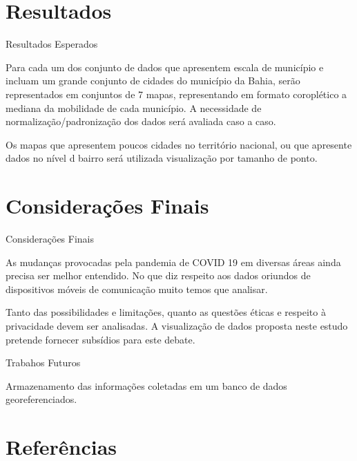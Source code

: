 \documentclass[10pt]{beamer}
\begin{document}
\section{Resultados}

\begin{frame}{Resultados Esperados}

  Para cada um dos conjunto de dados que apresentem escala de município e incluam um grande conjunto de cidades do município da Bahia, serão representados em conjuntos de 7 mapas, representando em formato coroplético a mediana da mobilidade de cada município. A necessidade de normalização/padronização dos dados será avaliada caso a caso. 

  Os mapas que apresentem poucos cidades no território nacional, ou que apresente dados no nível d bairro será utilizada visualização por tamanho de ponto.
  
\end{frame}

\section{Considerações Finais}

\begin{frame}{Considerações Finais}

  As mudanças provocadas pela pandemia de COVID 19 em diversas áreas ainda precisa ser melhor entendido. No que diz respeito aos dados oriundos de dispositivos móveis de comunicação muito temos que analisar.

  Tanto das possibilidades e limitações, quanto as questões éticas e respeito à privacidade devem ser analisadas. A visualização de dados proposta neste estudo pretende fornecer subsídios para este debate. 


\end{frame}

\begin{frame}{Trabahos Futuros}

  Armazenamento das informações coletadas em um banco de dados georeferenciados.
  
\end{frame}

\section{Referências}

\begin{frame}[allowframebreaks]

  
  
\end{frame}
\end{document}
